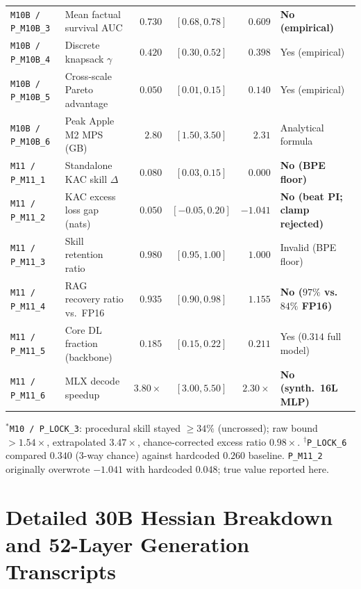 \documentclass[10pt]{article} %
\begin{document}
\begin{table}[htbp]
\begin{center}
\begin{tabular}{l l r c r l}
\texttt{M10B / P\_M10B\_3} & Mean factual survival AUC & $0.730$ & $[0.68, 0.78]$ & $0.609$ & \textbf{No (empirical)} \\
\texttt{M10B / P\_M10B\_4} & Discrete knapsack $\gamma$ & $0.420$ & $[0.30, 0.52]$ & $0.398$ & Yes (empirical) \\
\texttt{M10B / P\_M10B\_5} & Cross-scale Pareto advantage & $0.050$ & $[0.01, 0.15]$ & $0.140$ & Yes (empirical) \\
\texttt{M10B / P\_M10B\_6} & Peak Apple M2 MPS (GB) & $2.80$ & $[1.50, 3.50]$ & $2.31$ & Analytical formula \\
\midrule
\texttt{M11 / P\_M11\_1} & Standalone KAC skill $\Delta$ & $0.080$ & $[0.03, 0.15]$ & $0.000$ & \textbf{No (BPE floor)} \\
\texttt{M11 / P\_M11\_2} & KAC excess loss gap (nats) & $0.050$ & $[-0.05, 0.20]$ & $-1.041$ & \textbf{No (beat PI; clamp rejected)} \\
\texttt{M11 / P\_M11\_3} & Skill retention ratio & $0.980$ & $[0.95, 1.00]$ & $1.000$ & Invalid (BPE floor) \\
\texttt{M11 / P\_M11\_4} & RAG recovery ratio vs.\ FP16 & $0.935$ & $[0.90, 0.98]$ & $1.155$ & \textbf{No ($97\%$ vs.\ $84\%$ FP16)} \\
\texttt{M11 / P\_M11\_5} & Core DL fraction (backbone) & $0.185$ & $[0.15, 0.22]$ & $0.211$ & Yes ($0.314$ full model) \\
\texttt{M11 / P\_M11\_6} & MLX decode speedup & $3.80\times$ & $[3.00, 5.50]$ & $2.30\times$ & \textbf{No (synth.\ 16L MLP)} \\
\bottomrule
\end{tabular}
\par\vspace{3pt}
\parbox{\linewidth}{\scriptsize $^*$\texttt{M10 / P\_LOCK\_3}: procedural skill stayed $\ge 34\%$ (uncrossed); raw bound $>1.54\times$, extrapolated $3.47\times$, chance-corrected excess ratio $0.98\times$. $^\dagger$\texttt{P\_LOCK\_6} compared $0.340$ (3-way chance) against hardcoded $0.260$ baseline. \texttt{P\_M11\_2} originally overwrote $-1.041$ with hardcoded $0.048$; true value reported here.}
\end{center}
\end{table}

\clearpage
\section{Detailed 30B Hessian Breakdown and 52-Layer Generation Transcripts}
\label{app:30b_tables}
\end{document}
